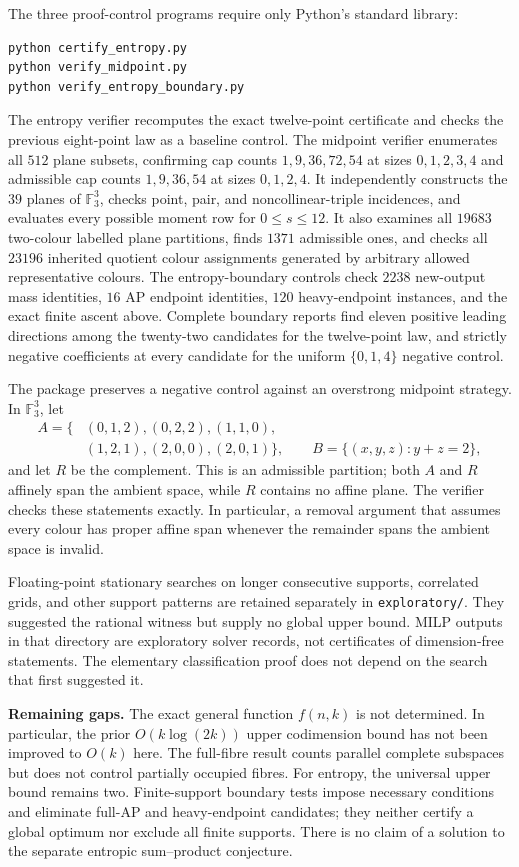 \documentclass[11pt]{article}
\theoremstyle{remark}
\newcommand{\F}{\mathbb F_3}
\begin{document}
The three proof-control programs require only Python's standard library:
\begin{verbatim}
python certify_entropy.py
python verify_midpoint.py
python verify_entropy_boundary.py
\end{verbatim}
The entropy verifier recomputes the exact twelve-point certificate and
checks the previous eight-point law as a baseline control. The midpoint
verifier enumerates all $512$ plane subsets, confirming cap counts
$1,9,36,72,54$ at sizes $0,1,2,3,4$ and admissible cap counts
$1,9,36,54$ at sizes $0,1,2,4$. It independently constructs the $39$
planes of $\F^3$, checks point, pair, and noncollinear-triple incidences,
and evaluates every possible moment row for $0\leq s\leq12$.
It also examines all $19683$ two-colour labelled plane partitions,
finds $1371$ admissible ones, and checks all $23196$ inherited quotient
colour assignments generated by arbitrary allowed representative colours.
The entropy-boundary controls check $2238$ new-output mass identities,
$16$ AP endpoint identities, $120$ heavy-endpoint instances, and the exact
finite ascent above. Complete boundary reports find eleven positive leading
directions among the twenty-two candidates for the twelve-point law, and
strictly negative coefficients at every candidate for the uniform
$\{0,1,4\}$ negative control.

The package preserves a negative control against an overstrong midpoint
strategy. In $\F^3$, let
\begin{align*}
 A=\{&(0,1,2),(0,2,2),(1,1,0),\\
     &(1,2,1),(2,0,0),(2,0,1)\},\qquad
 B=\{(x,y,z):y+z=2\},
\end{align*}
and let $R$ be the complement. This is an admissible partition; both $A$
and $R$ affinely span the ambient space, while $R$ contains no affine plane.
The verifier checks these statements exactly. In particular, a removal
argument that assumes every colour has proper affine span whenever the
remainder spans the ambient space is invalid.

Floating-point stationary searches on longer consecutive supports,
correlated grids, and other support patterns are retained separately in
\texttt{exploratory/}. They suggested the rational witness but supply no
global upper bound. MILP outputs in that directory are exploratory solver
records, not certificates of dimension-free statements. The elementary
classification proof does not depend on the search that first suggested it.

\textbf{Remaining gaps.} The exact general function $f(n,k)$ is not
determined. In particular, the prior $O(k\log(2k))$ upper codimension bound
has not been improved to $O(k)$ here. The full-fibre result counts parallel
complete subspaces but does not control partially occupied fibres.
For entropy, the universal upper bound remains two. Finite-support
boundary tests impose necessary conditions and eliminate full-AP and
heavy-endpoint candidates; they neither certify a global optimum nor
exclude all finite supports. There is no claim of a solution to the
separate entropic sum--product conjecture.
\end{document}

